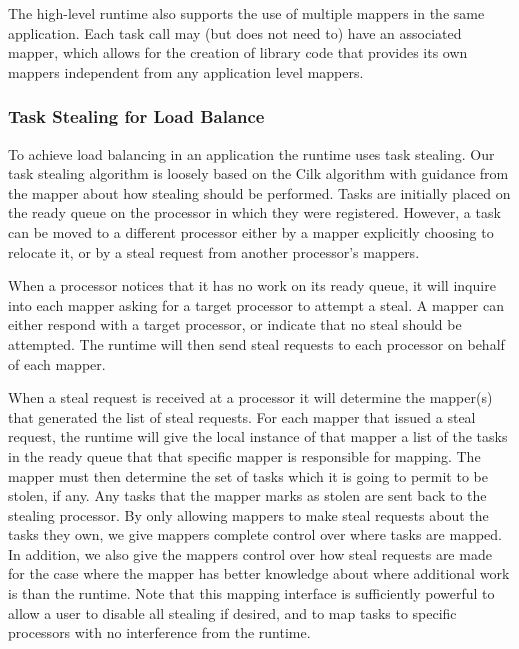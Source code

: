 The high-level runtime also supports the use of multiple mappers in the same application.  Each task 
call may (but does not need to) have an associated mapper,
which allows for the creation of library code that provides its own mappers independent
from any application level mappers.

\subsubsection{Task Stealing for Load Balance}
\label{subsec:steal}
To achieve load balancing in an application the runtime uses
task stealing.  Our task stealing algorithm is loosely based on the Cilk algorithm
\cite{CILK95} with guidance from the mapper about how stealing should be
performed.  Tasks are initially placed on the ready queue on the processor in which they
were registered.  However, a task can be moved to a different processor either by a mapper
explicitly choosing to relocate it, or by a steal request from another processor's mappers.

When a processor notices that it has no work on its ready queue, it will inquire into each
mapper asking for a target processor to attempt a steal.  A mapper can either respond with
a target processor, or indicate that no steal should be attempted.  The runtime will then
send steal requests to each processor on behalf of each mapper.  

When a steal request is received at a processor it will determine the mapper(s) that generated
the list of steal requests.  For each mapper that issued a steal request, the runtime will
give the local instance of that mapper a list of the tasks in the ready queue that that
specific mapper is responsible for mapping.  The mapper must then determine the set of tasks which
it is going to permit to be stolen, if any.  Any tasks that the mapper marks as stolen are
sent back to the stealing processor.  By only allowing mappers to make steal requests about
the tasks they own, we give mappers complete control over where tasks are mapped.
In addition, we also give the mappers control over how steal requests are made for
the case where the mapper has better knowledge about where additional work is than the 
runtime.  Note that this mapping interface is sufficiently powerful to allow a user to
disable all stealing if desired, and to map tasks to specific processors with no interference
from the runtime.

